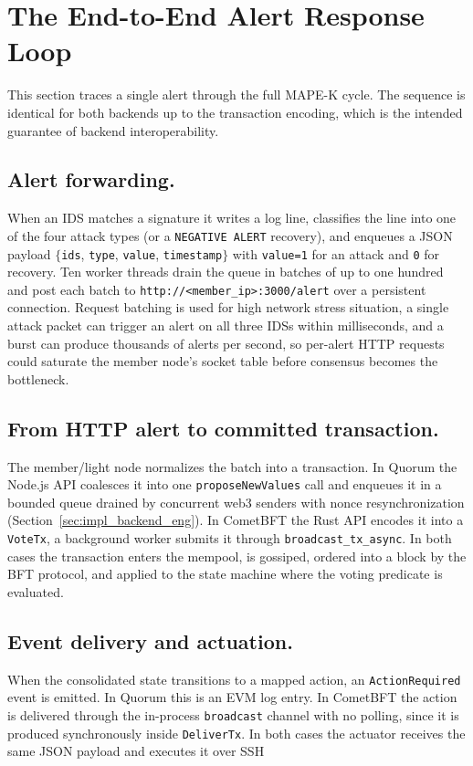 \section{The End-to-End Alert Response Loop}
\label{sec:impl_loop}

This section traces a single alert through the full MAPE-K cycle. The sequence is identical for both backends up to the transaction encoding, which is the intended guarantee of backend interoperability.


\subsection{Alert forwarding.} When an IDS matches a signature it writes a log line, classifies the line into one of the four attack types (or a \texttt{NEGATIVE ALERT} recovery), and enqueues a JSON payload $\{$\texttt{ids}, \texttt{type}, \texttt{value}, \texttt{timestamp}$\}$ with \texttt{value=1} for an attack and \texttt{0} for recovery. Ten worker threads drain the queue in batches of up to one hundred and post each batch to \texttt{http://<member\_ip>:3000/alert} over a persistent connection. Request batching is used for high network stress situation, a single attack packet can trigger an alert on all three IDSs within milliseconds, and a burst can produce thousands of alerts per second, so per-alert HTTP requests could saturate the member node's socket table before consensus becomes the bottleneck.

\subsection{From HTTP alert to committed transaction.} The member/light node normalizes the batch into a transaction. In Quorum the Node.js API coalesces it into one \texttt{proposeNewValues} call and enqueues it in a bounded queue drained by concurrent web3 senders with nonce resynchronization (Section~\ref{sec:impl_backend_eng}). In CometBFT the Rust API encodes it into a \texttt{VoteTx}, a background worker submits it through \texttt{broadcast\_tx\_async}. In both cases the transaction enters the mempool, is gossiped, ordered into a block by the BFT protocol, and applied to the state machine where the voting predicate is evaluated.

\subsection{Event delivery and actuation.} When the consolidated state transitions to a mapped action, an \texttt{ActionRequired} event is emitted. In Quorum this is an EVM log entry. In CometBFT the action is delivered through the in-process \texttt{broadcast} channel with no polling, since it is produced synchronously inside \texttt{DeliverTx}. In both cases the actuator receives the same JSON payload and executes it over SSH

